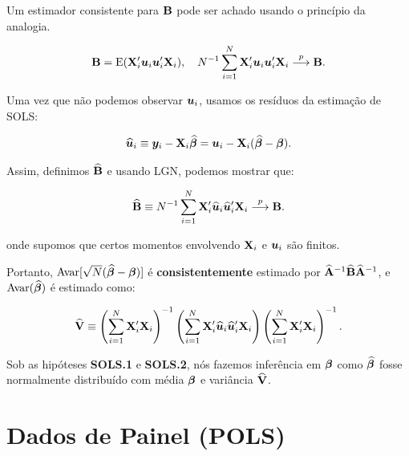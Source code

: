 \documentclass[11pt, oneside, a4paper, article]{article}
\numberwithin{equation}{section}
\begin{document}
Um estimador consistente para $\mathbf{B}$ pode ser achado usando o princípio da analogia.

\vspace{-1 em}
\begin{align*}
\mathbf{B} = \text{E}(\mathbf{X}_{i}' \boldsymbol{u}_{i} \boldsymbol{u}_{i}' \mathbf{X}_{i}), 
\quad
N^{-1}\sum_{i=1}^{N} \mathbf{X}_{i}' \boldsymbol{u}_{i} \boldsymbol{u}_{i}' \mathbf{X}_{i}  \overset{p}{\longrightarrow}  \mathbf{B}.
\end{align*}

Uma vez que não podemos observar $\boldsymbol{u}_{i}$, usamos os resíduos da estimação de SOLS:

\vspace{-1 em}
\begin{align*}
\widehat{\boldsymbol{u}}_{i} \equiv \boldsymbol{y}_{i} - \mathbf{X}_{i} \widehat{\boldsymbol{\beta}} 
=
\boldsymbol{u}_{i} - \mathbf{X}_{i} (\widehat{\boldsymbol{\beta}} - \boldsymbol{\beta}).
\end{align*}

Assim, definimos $\widehat{\mathbf{B}}$ e usando LGN, podemos mostrar que:

\vspace{-1 em}
\begin{align*}
\widehat{\mathbf{B}} \equiv N^{-1}\sum_{i=1}^{N} \mathbf{X}_{i}' \widehat{\boldsymbol{u}}_{i} \widehat{\boldsymbol{u}}_{i}' \mathbf{X}_{i} 
 \overset{p}{\longrightarrow}  \mathbf{B}.
\end{align*}

\noindent
onde supomos que certos momentos envolvendo $\mathbf{X}_{i}$ e $\boldsymbol{u}_{i}$ são finitos.

Portanto, $\text{Avar}[\sqrt{N}(\widehat{\boldsymbol{\beta}} - \boldsymbol{\beta})]$ é \textbf{consistentemente} estimado por $\widehat{\mathbf{A}}^{-1} \widehat{\mathbf{B}} \widehat{\mathbf{A}}^{-1}$, e $\text{Avar}(\widehat{\boldsymbol{\beta}})$ é estimado como:

\vspace{-1 em}
\begin{align*}
\widehat{\mathbf{V}} \equiv 
\left( \sum_{i=1}^{N} \mathbf{X}_{i}' \mathbf{X}_{i}  \right)^{-1}
\left( \sum_{i=1}^{N} \mathbf{X}_{i}' \widehat{\boldsymbol{u}}_{i} \widehat{\boldsymbol{u}}_{i}'  \mathbf{X}_{i}  \right)
\left( \sum_{i=1}^{N} \mathbf{X}_{i}' \mathbf{X}_{i}  \right)^{-1}.
\end{align*}

Sob as hipóteses \textbf{SOLS.1} e \textbf{SOLS.2}, nós fazemos inferência em $\boldsymbol{\beta}$ como $\widehat{\boldsymbol{\beta}}$ fosse normalmente distribuído com média $\boldsymbol{\beta}$ e variância $\widehat{\mathbf{V}}$.


\clearpage
\section{Dados de Painel (POLS)}
\noindent
\citet[C.7 -- Estimating Systems of Equations by OLS and GLS. p.143-179]{wool-2010} \\
\citet[Sec.7.8 -- The Linear Panel Data Model, Revisited. p.169]{wool-2010} 
\end{document}
